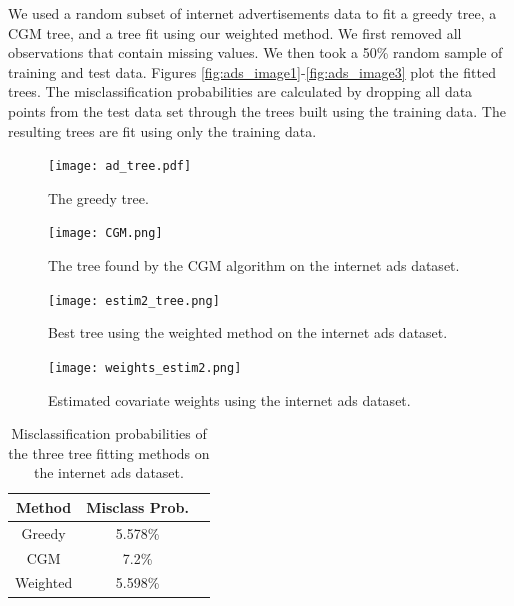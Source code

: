 We used a random subset of internet advertisements data to fit a greedy tree, a CGM tree, and a tree fit using our weighted method. We first removed all observations that contain missing values. We then took a 50\% random sample of training and test data. Figures \ref{fig:ads_image1}-\ref{fig:ads_image3} plot the fitted trees. The misclassification probabilities are calculated by dropping all data points from the test data set through the trees built using the training data. The resulting trees are fit using only the training data.  
\begin{figure}[h]
\label{fig:3fig_tree}
  \texttt{[image: ad\_tree.pdf]}
  \caption[The greedy algorithm tree for the internet ads dataset]{The greedy tree.}\label{fig:ads_image1}
\endminipage\hfill
\hspace{-1cm}
  \texttt{[image: CGM.png]}
  \caption[The CGM algorithm tree for the internet ads dataset]{The tree found by the CGM algorithm on the internet ads dataset.}\label{fig:ads_image2}
\endminipage\hfill
\end{figure}
\begin{figure}
%
  \texttt{[image: estim2\_tree.png]}
  \caption[The weighted method tree for the internet ads dataset]{Best tree using the weighted method on the internet ads dataset.}\label{fig:ads_image3}
\endminipage\hfill
{}%
\hspace{-1cm}
  \texttt{[image: weights\_estim2.png]}
  \caption[Estimated covariate weights for the internet ads dataset]{Estimated covariate weights using the internet ads dataset.}\label{fig:ads_image4}
\label{fig:uci_cov_weights}
\endminipage
\end{figure}
\begin{table}[h]\footnotesize
\centering
  \begin{tabular}{| c | c | c }
  \hline 
Method & Misclass Prob.\\
      \hline 
Greedy & 5.578\% \\ %
 CGM &   7.2\% \\%
   Weighted & 5.598\% \\%
      \hline
  \end{tabular}
    \caption[Misclassification probabilities for internet ads dataset]{Misclassification probabilities of the three tree fitting methods on the internet ads dataset.}
      \label{tab:misclass_uci}
\centering
\end{table}

